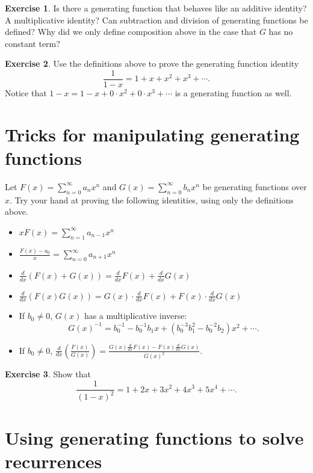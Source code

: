 \documentclass[11pt]{article}
\theoremstyle{definition}
\newtheorem*{exercise}{Exercise}
\begin{document}
\begin{exercise}
  Is there a generating function that behaves like an additive identity?  A multiplicative identity?  Can subtraction and division of generating functions be defined?  Why did we only define composition above in the case that $G$ has no constant term?
\end{exercise}

\begin{exercise}
  Use the definitions above to prove the generating function identity $$\frac{1}{1-x}=1+x+x^2+x^3+\cdots.$$  Notice that $1-x=1-x+0\cdot x^2+0\cdot x^3+\cdots$ is a generating function as well.
\end{exercise}

\section*{Tricks for manipulating generating functions}

Let $F(x)=\sum_{n=0}^\infty a_n x^n$ and $G(x)=\sum_{n=0}^\infty b_n x^n$ be generating functions over $x$.  Try your hand at proving the following identities, using only the definitions above.

\begin{itemize}
  \item $x F(x)=\displaystyle\sum_{n=1}^\infty a_{n-1}x^n$
  \item $\displaystyle{\frac{F(x)-a_0}{x} = \sum_{n=0}^\infty a_{n+1}x^n}$
  \item $\displaystyle{\frac{d}{dx} (F(x)+G(x))=\frac{d}{dx}F(x)+\frac{d}{dx}G(x)}$
  \item $\displaystyle{\frac{d}{dx} (F(x)G(x))=G(x)\cdot\frac{d}{dx}F(x)+F(x)\cdot \frac{d}{dx}G(x)}$
  \item If $b_0\neq 0$, $G(x)$ has a multiplicative inverse: $$G(x)^{-1}=b_0^{-1}-b_0^{-1}b_1x+ (b_0^{-3}b_1^2-b_0^{-2}b_2)x^2+\cdots.$$
  \item If $b_0\neq 0$, $\displaystyle{\frac{d}{dx} \left(\frac{F(x)}{G(x)}\right)=\frac{G(x)\frac{d}{dx}F(x)-F(x)\frac{d}{dx}G(x)}{G(x)^2}}$.
\end{itemize}

\begin{exercise}  Show that
 $$\frac{1}{(1-x)^2}=1+2x+3x^2+4x^3+5x^4+\cdots.$$ 
\end{exercise}

\section*{Using generating functions to solve recurrences}
\end{document}
